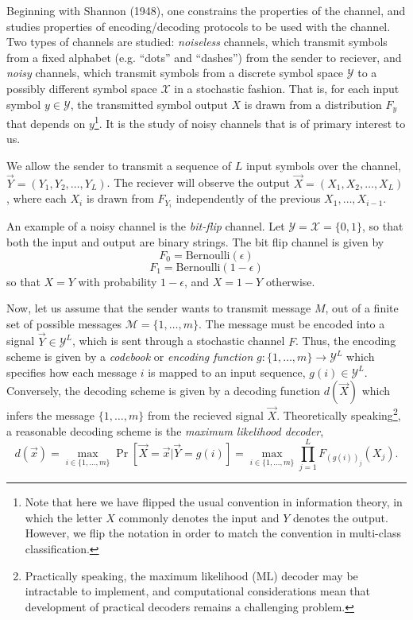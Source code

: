 Beginning with Shannon (1948), one constrains the properties of the
channel, and studies properties of encoding/decoding protocols to be
used with the channel.  Two types of channels are studied:
\emph{noiseless} channels, which transmit symbols from a fixed
alphabet (e.g. ``dots'' and ``dashes'') from the sender to reciever,
and \emph{noisy} channels, which transmit symbols from a discrete
symbol space $\mathcal{Y}$ to a possibly different symbol space
$\mathcal{X}$ in a stochastic fashion.  That is, for each input symbol
$y \in \mathcal{Y}$, the transmitted symbol output $X$ is drawn from a
distribution $F_y$ that depends on $y$\footnote{Note that here we
  have flipped the usual convention in information theory, in which
  the letter $X$ commonly denotes the input and $Y$ denotes the
  output.  However, we flip the notation in order to match the
  convention in multi-class classification.}.  It is the study of
noisy channels that is of primary interest to us.

We allow the sender to transmit a sequence of $L$ input symbols over
the channel, $\vec{Y} = (Y_1,Y_2,\hdots, Y_L)$. The reciever will observe the
output $\vec{X} = (X_1,X_2,\hdots, X_L)$, where each $X_i$ is drawn from
$F_{Y_i}$ independently of the previous $X_1,\hdots, X_{i-1}$.

An example of a noisy channel is the \emph{bit-flip} channel.
Let $\mathcal{Y} = \mathcal{X} = \{0,1\}$, so that both the input and output are binary strings.
The bit flip channel is given by
\[
F_0 = \text{Bernoulli}(\epsilon)
\]
\[
F_1 = \text{Bernoulli}(1-\epsilon)
\]
so that $X = Y$ with probability $1-\epsilon$, and $X = 1-Y$
otherwise.

Now, let us assume that the sender wants to transmit message $M$, out
of a finite set of possible messages $\mathcal{M} = \{1,\hdots, m\}$.
The message must be encoded into a signal $\vec{Y} \in \mathcal{Y}^L$,
which is sent through a stochastic channel $F$.  Thus, the encoding
scheme is given by a \emph{codebook} or \emph{encoding function} $g:
\{1,\hdots, m\} \to \mathcal{Y}^L$ which specifies how each message
$i$ is mapped to an input sequence, $g(i) \in \mathcal{Y}^L$.
Conversely, the decoding scheme is given by a decoding function
$d(\vec{X})$ which infers the message $\{1,\hdots, m\}$ from the
recieved signal $\vec{X}$.  Theoretically
speaking\footnote{Practically speaking, the maximum likelihood (ML)
  decoder may be intractable to implement, and computational
  considerations mean that development of practical decoders remains a
  challenging problem.}, a reasonable decoding scheme is the
\emph{maximum likelihood decoder},
\[
d(\vec{x}) = \max_{i \in \{1,\hdots, m\}} \Pr[\vec{X} = \vec{x}| \vec{Y} = g(i)] = \max_{i \in \{1,\hdots, m\}} \prod_{j=1}^L F_{(g(i))_j}(X_j).
\]

